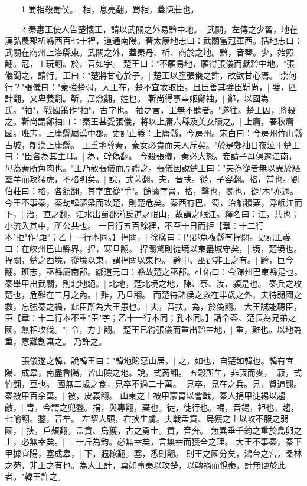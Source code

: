 　　1 蜀相殺蜀侯。|{
	相，息亮翻。蜀相，蓋陳莊也。
	}

　　2 秦惠王使人告楚懷王，請以武關之外易黔中地。|{
	武關，左傳之少習，地在漢弘農郡析縣西百七十裡，道通南陽。晉太康地志曰：武關當冠軍西。括地志曰：武關在商州上洛縣東。武關之外，蓋秦丹、析、商於之地。黔，音琴。少，始照翻。冠，工玩翻。於，音如字。
	}
楚王曰："不願易地，願得張儀而獻黔中地。"張儀聞之，請行。王曰："楚將甘心於子，|{
	楚王以墮張儀之詐，故欲甘心焉。
	}
柰何行？"張儀曰："秦強楚弱，大王在，楚不宜敢取臣。且臣善其嬖臣靳尚，|{
	嬖，匹計翻，又卑義翻。靳，居焮翻，姓也。
	}
靳尚得事幸姬鄭袖，|{
	鄭，以國為氏。"袖"，戰國策作"袖"，古字也。
	}
袖之言，王無不聽者。"遂往。楚王囚，將殺之。靳尚謂鄭袖曰："秦王甚愛張儀，將以上庸六縣及美女贖之。|{
	上庸，春秋庸國。班志，上庸縣屬漢中郡。史記正義：上庸縣，今房州。宋白曰：今房州竹山縣古城，卽漢上庸縣。
	}
王重地尊秦，秦女必貴而夫人斥矣。"於是鄭袖日夜泣于楚王曰："臣各為其主耳。|{
	為，幹偽翻。
	}
今殺張儀，秦必大怒。妾請子母俱遷江南，毋為秦所魚肉也。"王乃赦張儀而厚禮之。張儀因說楚王曰："夫為從者無以異於驅羣羊而攻猛虎，不格明矣。|{
	說，式芮翻。夫，音扶。從，子容翻。格，當也。劉伯莊曰：格，各額翻，其字宜從"手"。餘據字書，格，擊也，鬭也，從"木"亦通。
	}
今王不事秦，秦劫韓驅梁而攻楚，則楚危矣。秦西有巴、蜀，治船積粟，浮岷江而下，|{
	治，直之翻。江水出蜀郡湔氐道之岷山，故謂之岷江。釋名曰：江，共也；小流入其中，所公共也。
	}
一日行五百餘裡，不至十日而拒【章：十二行本"拒"作"距"；乙十一行本同。】捍關，|{
	徐廣曰：巴郡魚複縣有捍關。史記正義曰：在峽州巴山縣界。捍，寒旦翻。
	}
捍關驚則從境以東盡城守矣，|{
	境，楚境也。捍關，楚之西境，從境以東，謂捍關以東也。
	}
黔中、巫郡非王之有。|{
	黔，巨今翻。班志，巫縣屬南郡。酈道元曰：縣故楚之巫郡。杜佑曰：今歸州巴東縣是也。
	}
秦舉甲出武關，則北地絕。|{
	北地，楚北境之地，陳、蔡、汝、潁是也。
	}
秦兵之攻楚也，危難在三月之內。|{
	難，乃旦翻。
	}
而楚待諸侯之救在半歲之外，夫待弱國之救，忘強秦之禍，此臣所為大王患也。|{
	夫，音扶。為，於偽翻。
	}
大王誠能聽臣，臣【章：十二行本不重"臣"字；乙十一行本同；孔本同。】請令秦、楚長為兄弟之國，無相攻伐。"|{
	令，力丁翻。
	}
楚王已得張儀而重出黔中地，|{
	重，難也。以地為重，意難割棄之。
	}
乃許之。

　　張儀遂之韓，說韓王曰："韓地險惡山居，|{
	之，如也，自楚如韓也。韓有宜陽、成皋，南盡魯陽，皆山險之地。說，式芮翻。
	}
五穀所生，非菽而麥，|{
	菽，式竹翻，豆也。
	}
國無二歲之食，見卒不過二十萬。|{
	見卒，見在之兵。見，賢遍翻。
	}
秦被甲百余萬。|{
	被，皮義翻。
	}
山東之士被甲蒙胄以會戰，秦人捐甲徒裼以趨敵，|{
	胄，今謂之兜鍪。捐，與專翻，棄也。徒，徒行也。裼，音錫，袒也。趨，七喻翻。鍪，音牟。
	}
左挈人頭，右挾生虜。夫戰孟賁、烏獲之士以攻不服之弱國，|{
	挾，戶頰翻。孟賁、烏獲，古之勇士。賁，音奔。
	}
無異垂千鈞之重於鳥卵之上，必無幸矣。|{
	三十斤為鈞。必無幸矣，言無幸而獲全之理。
	}
大王不事秦，秦下甲據宜陽，塞成皋，|{
	下，遐稼翻。塞，悉則翻。
	}
則王之國分矣，鴻台之宮，桑林之苑，非王之有也。為大王計，莫如事秦以攻楚，以轉禍而悅秦，計無便於此者。"韓王許之。

